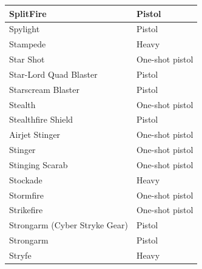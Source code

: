 \begin{table}
\begin{tabular}{|l|l|}
 \hline SplitFire & Pistol \\
 \hline Spylight & Pistol \\
 \hline Stampede & Heavy \\
 \hline Star Shot & One-shot pistol \\
 \hline Star-Lord Quad Blaster & Pistol \\
 \hline Starscream Blaster & Pistol \\
 \hline Stealth & One-shot pistol \\
 \hline Stealthfire Shield & Pistol \\
 \hline Airjet Stinger & One-shot pistol \\
 \hline Stinger & One-shot pistol \\
 \hline Stinging Scarab & One-shot pistol \\
 \hline Stockade & Heavy \\
 \hline Stormfire & One-shot pistol \\
 \hline Strikefire & One-shot pistol \\
 \hline Strongarm (Cyber Stryke Gear) & Pistol \\
 \hline Strongarm & Pistol \\
 \hline Stryfe & Heavy \\
 \hline \end{tabular}

\end{table}

	

